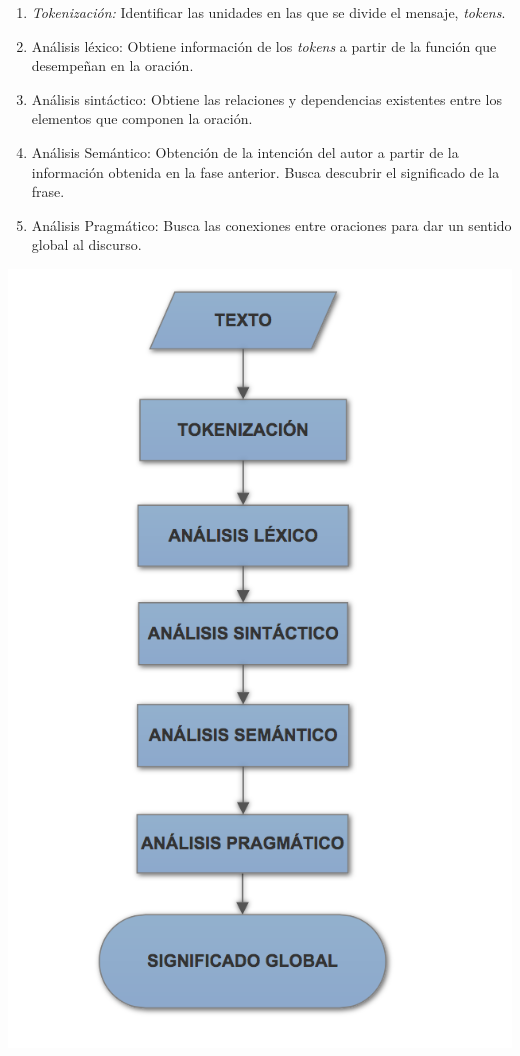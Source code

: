 		\begin{minipage}{.65\textwidth}
			\begin{enumerate}%
				\item \textit{Tokenización: }  Identificar las unidades en las que se divide el mensaje, \textit{tokens}.
				\item Análisis léxico: Obtiene información de los \textit{tokens} a partir de la función que desempeñan en la oración.
				\item Análisis sintáctico: Obtiene las relaciones y dependencias existentes entre los elementos que componen la oración.
				\item Análisis Semántico: Obtención de la intención del autor a partir de la información obtenida en la fase anterior. Busca descubrir el significado de la frase.
				\item Análisis Pragmático: Busca las conexiones entre oraciones para dar un sentido global al discurso.
			\end{enumerate}
		\end{minipage}
		\begin{minipage}{.35\textwidth}
			\includegraphics[width=1\linewidth]{imagenes/flujo}
		\end{minipage}
		
